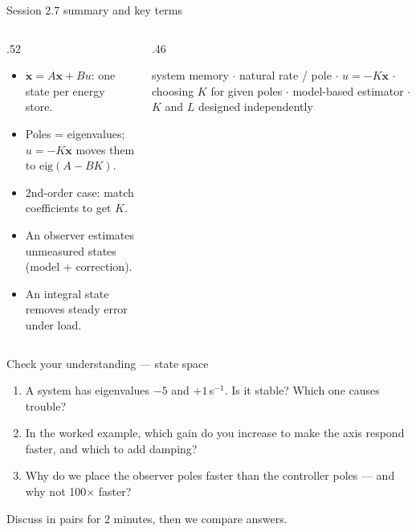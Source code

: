 \documentclass[aspectratio=169,10pt]{beamer}
\begin{document}
\begin{frame}{Session 2.7 summary and key terms}
\begin{columns}[T]
\begin{column}{.52\textwidth}
\begin{keybox}
\begin{itemize}\setlength\itemsep{.4mm}
\item $\dot{\bm x}=A\bm x+Bu$: one state per energy store.
\item Poles = eigenvalues; $u=-K\bm x$ moves them to $\mathrm{eig}(A-BK)$.
\item 2nd-order case: match coefficients to get $K$.
\item An observer estimates unmeasured states (model + correction).
\item An integral state removes steady error under load.
\end{itemize}
\end{keybox}
\end{column}
\begin{column}{.46\textwidth}
\begin{defbox}
\small
{} system memory $\cdot$  natural rate / pole $\cdot$  $u=-K\bm x$ $\cdot$  choosing $K$ for given poles $\cdot$  model-based estimator $\cdot$  $K$ and $L$ designed independently
\end{defbox}
\end{column}
\end{columns}
\end{frame}

\begin{frame}{Check your understanding --- state space}
\begin{keybox}
\begin{enumerate}\setlength\itemsep{2mm}
\item A system has eigenvalues $-5$ and $+1$\,s$^{-1}$. Is it stable? Which one causes trouble?
\item In the worked example, which gain do you increase to make the axis respond faster, and which to add damping?
\item Why do we place the observer poles faster than the controller poles --- and why not 100$\times$ faster?
\end{enumerate}
\end{keybox}
\vspace{2mm}
{\small\color{mkGray}Discuss in pairs for 2 minutes, then we compare answers.}
\end{frame}
\end{document}
